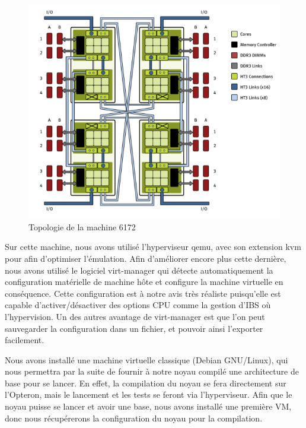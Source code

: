     \begin{figure}[H]
      \includegraphics[scale=0.4]{img/numa_arch_details.png}
      \caption{Topologie de la machine 6172}
      \label{f:numa_topology}
    \end{figure}

    Sur cette machine, nous avons utilisé l'hyperviseur qemu, avec son extension
    kvm pour afin d'optimiser l'émulation. Afin d'améliorer encore plus cette
    dernière, nous avons utilisé le logiciel virt-manager qui détecte
    automatiquement la configuration matérielle de machine hôte et configure la
    machine virtuelle en conséquence. Cette configuration est à notre avis très
    réaliste puisqu'elle est capable d'activer/désactiver des options CPU comme
    la gestion d'IBS où l'hypervision. Un des autres avantage de virt-manager
    est que l'on peut sauvegarder la configuration dans un fichier, et pouvoir
    ainsi l'exporter facilement.

    Nous avons installé une machine virtuelle classique (Debian GNU/Linux), qui
    nous permettra par la suite de fournir à notre noyau compilé une
    architecture de base pour se lancer. En effet, la compilation du noyau se
    fera directement sur l'Opteron, mais le lancement et les tests se feront via
    l'hyperviseur. Afin que le noyau puisse se lancer et avoir une base, nous
    avons installé une première VM, donc nous récupérerons la configuration du
    noyau pour la compilation.

